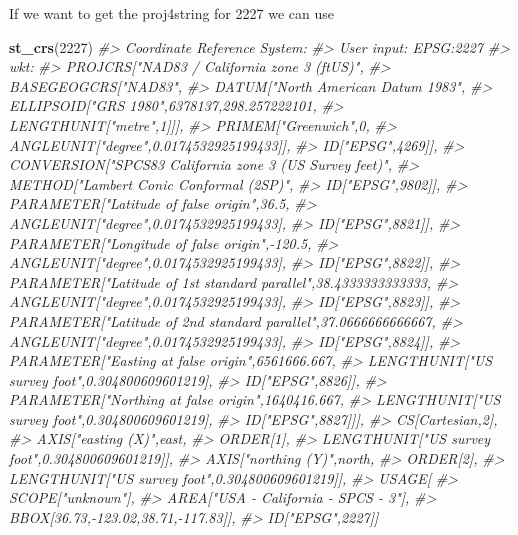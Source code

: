 \documentclass[
  12pt,
]{book}
\newenvironment{Shaded}{\begin{snugshade}}{\end{snugshade}}
\newcommand{\CommentTok}[1]{\textcolor[rgb]{0.56,0.35,0.01}{\textit{#1}}}
\newcommand{\DecValTok}[1]{\textcolor[rgb]{0.00,0.00,0.81}{#1}}
\newcommand{\KeywordTok}[1]{\textcolor[rgb]{0.13,0.29,0.53}{\textbf{#1}}}
\newcommand{\NormalTok}[1]{#1}
\begin{document}
If we want to get the proj4string for 2227 we can use

\begin{Shaded}
\begin{Highlighting}[]
\KeywordTok{st\_crs}\NormalTok{(}\DecValTok{2227}\NormalTok{)}
\CommentTok{\#> Coordinate Reference System:}
\CommentTok{\#>   User input: EPSG:2227 }
\CommentTok{\#>   wkt:}
\CommentTok{\#> PROJCRS["NAD83 / California zone 3 (ftUS)",}
\CommentTok{\#>     BASEGEOGCRS["NAD83",}
\CommentTok{\#>         DATUM["North American Datum 1983",}
\CommentTok{\#>             ELLIPSOID["GRS 1980",6378137,298.257222101,}
\CommentTok{\#>                 LENGTHUNIT["metre",1]]],}
\CommentTok{\#>         PRIMEM["Greenwich",0,}
\CommentTok{\#>             ANGLEUNIT["degree",0.0174532925199433]],}
\CommentTok{\#>         ID["EPSG",4269]],}
\CommentTok{\#>     CONVERSION["SPCS83 California zone 3 (US Survey feet)",}
\CommentTok{\#>         METHOD["Lambert Conic Conformal (2SP)",}
\CommentTok{\#>             ID["EPSG",9802]],}
\CommentTok{\#>         PARAMETER["Latitude of false origin",36.5,}
\CommentTok{\#>             ANGLEUNIT["degree",0.0174532925199433],}
\CommentTok{\#>             ID["EPSG",8821]],}
\CommentTok{\#>         PARAMETER["Longitude of false origin",{-}120.5,}
\CommentTok{\#>             ANGLEUNIT["degree",0.0174532925199433],}
\CommentTok{\#>             ID["EPSG",8822]],}
\CommentTok{\#>         PARAMETER["Latitude of 1st standard parallel",38.4333333333333,}
\CommentTok{\#>             ANGLEUNIT["degree",0.0174532925199433],}
\CommentTok{\#>             ID["EPSG",8823]],}
\CommentTok{\#>         PARAMETER["Latitude of 2nd standard parallel",37.0666666666667,}
\CommentTok{\#>             ANGLEUNIT["degree",0.0174532925199433],}
\CommentTok{\#>             ID["EPSG",8824]],}
\CommentTok{\#>         PARAMETER["Easting at false origin",6561666.667,}
\CommentTok{\#>             LENGTHUNIT["US survey foot",0.304800609601219],}
\CommentTok{\#>             ID["EPSG",8826]],}
\CommentTok{\#>         PARAMETER["Northing at false origin",1640416.667,}
\CommentTok{\#>             LENGTHUNIT["US survey foot",0.304800609601219],}
\CommentTok{\#>             ID["EPSG",8827]]],}
\CommentTok{\#>     CS[Cartesian,2],}
\CommentTok{\#>         AXIS["easting (X)",east,}
\CommentTok{\#>             ORDER[1],}
\CommentTok{\#>             LENGTHUNIT["US survey foot",0.304800609601219]],}
\CommentTok{\#>         AXIS["northing (Y)",north,}
\CommentTok{\#>             ORDER[2],}
\CommentTok{\#>             LENGTHUNIT["US survey foot",0.304800609601219]],}
\CommentTok{\#>     USAGE[}
\CommentTok{\#>         SCOPE["unknown"],}
\CommentTok{\#>         AREA["USA {-} California {-} SPCS {-} 3"],}
\CommentTok{\#>         BBOX[36.73,{-}123.02,38.71,{-}117.83]],}
\CommentTok{\#>     ID["EPSG",2227]]}
\end{Highlighting}
\end{Shaded}
\end{document}
